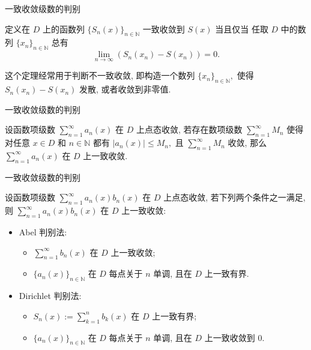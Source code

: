 
\begin{frame}{一致收敛级数的判别}

\begin{thm}[数列判别法]
定义在 $D$ 上的函数列 $\{S_n(x)\}_{n\in\mathbb{N}}$ 一致收敛到 $S(x)$ 当且仅当 任取 $D$ 中的数列 $\{x_n\}_{n\in\mathbb{N}}$ 总有
\[\lim\limits_{n\to\infty} (S_n(x_n) - S(x_n)) = 0.\]
\end{thm}

\pause
\vspace{1em}

这个定理经常用于判断不一致收敛, 即构造一个数列 $\{x_n\}_{n\in\mathbb{N}},$ 使得 $S_n(x_n) - S(x_n)$ 发散, 或者收敛到非零值.

\end{frame}


\begin{frame}{一致收敛级数的判别}

\begin{thm}
设函数项级数 $\sum\limits_{n=1}^\infty a_n(x)$ 在 $D$ 上点态收敛, 若存在数项级数 $\sum\limits_{n=1}^\infty M_n$ 使得对任意 $x \in D$ 和 $n \in \mathbb{N}$ 都有 $\lvert a_n(x) \rvert \leqslant M_n,$ 且 $\sum\limits_{n=1}^\infty M_n$ 收敛, 那么 $\sum\limits_{n=1}^\infty a_n(x)$ 在 $D$ 上一致收敛.
\end{thm}

\end{frame}


\begin{frame}{一致收敛级数的判别}

\begin{thm}[A-D 判别法]
设函数项级数 $\sum\limits_{n=1}^\infty a_n(x)b_n(x)$ 在 $D$ 上点态收敛, 若下列两个条件之一满足, 则 $\sum\limits_{n=1}^\infty a_n(x)b_n(x)$ 在 $D$ 上一致收敛:
\begin{itemize}[<+->]
\item Abel 判别法:
\begin{itemize}
\item $\sum\limits_{n=1}^\infty b_n(x)$ 在 $D$ 上一致收敛;
\item $\{a_n(x)\}_{n\in\mathbb{N}}$ 在 $D$ 每点关于 $n$ 单调, 且在 $D$ 上一致有界.
\end{itemize}
\item Dirichlet 判别法:
\begin{itemize}
\item $S_n(x) := \sum\limits_{k=1}^n b_k(x)$ 在 $D$ 上一致有界;
\item $\{a_n(x)\}_{n\in\mathbb{N}}$ 在 $D$ 每点关于 $n$ 单调, 且在 $D$ 上一致收敛到 $0.$
\end{itemize}
\end{itemize}
\end{thm}

\end{frame}


